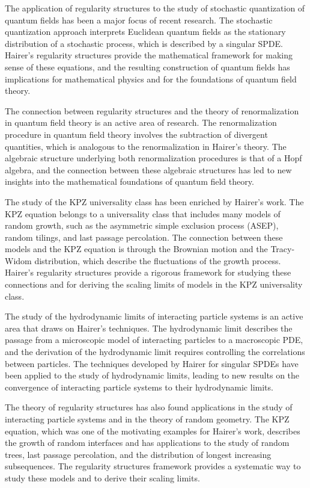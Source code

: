 The application of regularity structures to the study of stochastic quantization of quantum fields has been a major focus of recent research. The stochastic quantization approach interprets Euclidean quantum fields as the stationary distribution of a stochastic process, which is described by a singular SPDE. Hairer's regularity structures provide the mathematical framework for making sense of these equations, and the resulting construction of quantum fields has implications for mathematical physics and for the foundations of quantum field theory.

The connection between regularity structures and the theory of renormalization in quantum field theory is an active area of research. The renormalization procedure in quantum field theory involves the subtraction of divergent quantities, which is analogous to the renormalization in Hairer's theory. The algebraic structure underlying both renormalization procedures is that of a Hopf algebra, and the connection between these algebraic structures has led to new insights into the mathematical foundations of quantum field theory.

The study of the KPZ universality class has been enriched by Hairer's work. The KPZ equation belongs to a universality class that includes many models of random growth, such as the asymmetric simple exclusion process (ASEP), random tilings, and last passage percolation. The connection between these models and the KPZ equation is through the Brownian motion and the Tracy-Widom distribution, which describe the fluctuations of the growth process. Hairer's regularity structures provide a rigorous framework for studying these connections and for deriving the scaling limits of models in the KPZ universality class.

The study of the hydrodynamic limits of interacting particle systems is an active area that draws on Hairer's techniques. The hydrodynamic limit describes the passage from a microscopic model of interacting particles to a macroscopic PDE, and the derivation of the hydrodynamic limit requires controlling the correlations between particles. The techniques developed by Hairer for singular SPDEs have been applied to the study of hydrodynamic limits, leading to new results on the convergence of interacting particle systems to their hydrodynamic limits.

The theory of regularity structures has also found applications in the study of interacting particle systems and in the theory of random geometry. The KPZ equation, which was one of the motivating examples for Hairer's work, describes the growth of random interfaces and has applications to the study of random trees, last passage percolation, and the distribution of longest increasing subsequences. The regularity structures framework provides a systematic way to study these models and to derive their scaling limits.

